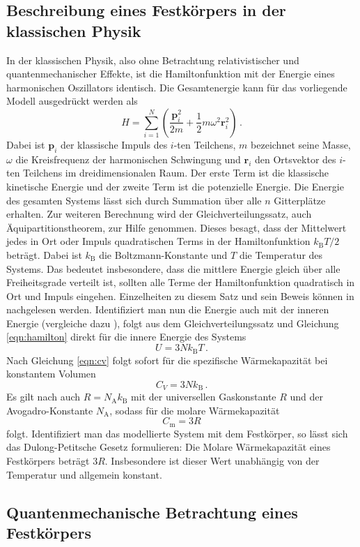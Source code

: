 \subsection{Beschreibung eines Festkörpers in der klassischen Physik}
In der klassischen Physik, also ohne Betrachtung relativistischer und quantenmechanischer
Effekte, ist die Hamiltonfunktion mit der Energie eines harmonischen
Oszillators identisch. Die Gesamtenergie kann für das vorliegende Modell ausgedrückt werden als
\begin{equation}
  H = \sum_{i=1}^N (\frac{\symbf{p}_i^2}{2 m} + \frac{1}{2} m \omega^2 \symbf{r}_i^2)\,.
  \label{eqn:hamilton}
\end{equation}
Dabei ist $\symbf{p}_i$ der klassische Impuls des $i$-ten Teilchens,
$m$ bezeichnet seine Masse, $\omega$ die Kreisfrequenz der harmonischen Schwingung und $\symbf{r}_i$
den Ortsvektor des $i$-ten Teilchens im dreidimensionalen Raum. Der erste Term ist die klassische kinetische
Energie und der zweite Term ist die potenzielle Energie. Die Energie des gesamten
Systems lässt sich durch Summation über alle $n$ Gitterplätze erhalten.\newline
Zur weiteren Berechnung wird der Gleichverteilungssatz, auch
Äquipartitionstheorem, zur Hilfe genommen.
Dieses besagt, dass der Mittelwert jedes in Ort oder Impuls quadratischen Terms
in der Hamiltonfunktion $k_\text{B} T / 2$ beträgt.
Dabei ist $k_\text{B}$ die Boltzmann-Konstante und $T$ die Temperatur des Systems.
Das bedeutet insbesondere, dass die mittlere Energie gleich über alle
Freiheitsgrade verteilt ist, sollten alle Terme der Hamiltonfunktion quadratisch
in Ort und Impuls eingehen. Einzelheiten zu diesem Satz und sein Beweis können
in \cite{Gleichverteilungssatz} nachgelesen werden.\newline
Identifiziert man nun die Energie auch mit der inneren Energie (vergleiche dazu \cite{failure}), folgt aus dem Gleichverteilungssatz
und Gleichung \eqref{eqn:hamilton} direkt für die innere Energie des Systems
\begin{equation}
  U = 3 N k_\text{B} T\,.
  \label{eqn:usolid}
\end{equation}
Nach Gleichung \eqref{eqn:cv} folgt sofort für die spezifische Wärmekapazität
bei konstantem Volumen
\begin{equation}
  C_V = 3 N k_\text{B}\,.
  \label{eqn:cvsolid}
\end{equation}
Es gilt nach \cite{failure} auch $R = N_\text{A} k_\text{B}$ mit der universellen Gaskonstante $R$ und der
Avogadro-Konstante $N_\text{A}$, sodass für die molare Wärmekapazität
\begin{equation}
  C_\text{m} = 3 R
  \label{eqn:dulongpetit}
\end{equation}
folgt. Identifiziert man das modellierte System mit dem Festkörper, so lässt sich
das Dulong-Petitsche Gesetz formulieren: \newline
Die Molare Wärmekapazität eines Festkörpers beträgt $3 R$. Insbesondere ist dieser
Wert unabhängig von der Temperatur und allgemein konstant.
\subsection{Quantenmechanische Betrachtung eines Festkörpers}
